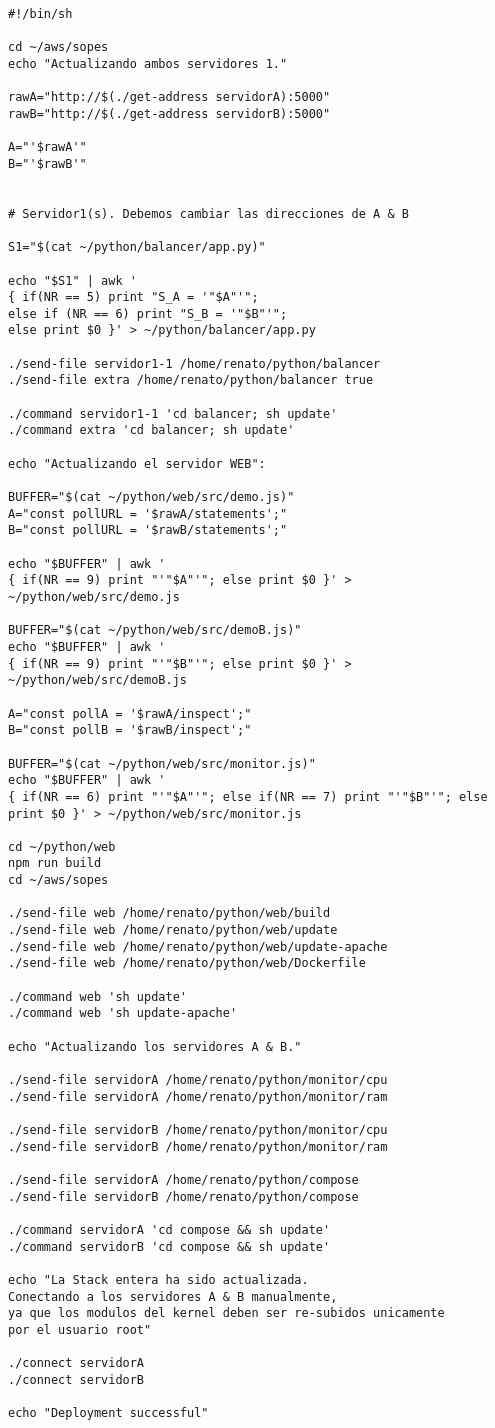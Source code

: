 \documentclass{article}
\begin{document}
\begin{lstlisting}[bash]
#!/bin/sh

cd ~/aws/sopes
echo "Actualizando ambos servidores 1."

rawA="http://$(./get-address servidorA):5000"
rawB="http://$(./get-address servidorB):5000"

A="'$rawA'"
B="'$rawB'"


# Servidor1(s). Debemos cambiar las direcciones de A & B

S1="$(cat ~/python/balancer/app.py)"

echo "$S1" | awk '
{ if(NR == 5) print "S_A = '"$A"'";
else if (NR == 6) print "S_B = '"$B"'"; 
else print $0 }' > ~/python/balancer/app.py 

./send-file servidor1-1 /home/renato/python/balancer
./send-file extra /home/renato/python/balancer true

./command servidor1-1 'cd balancer; sh update'
./command extra 'cd balancer; sh update'

echo "Actualizando el servidor WEB":

BUFFER="$(cat ~/python/web/src/demo.js)"
A="const pollURL = '$rawA/statements';"
B="const pollURL = '$rawB/statements';"

echo "$BUFFER" | awk '
{ if(NR == 9) print "'"$A"'"; else print $0 }' > ~/python/web/src/demo.js 

BUFFER="$(cat ~/python/web/src/demoB.js)"
echo "$BUFFER" | awk '
{ if(NR == 9) print "'"$B"'"; else print $0 }' > ~/python/web/src/demoB.js 

A="const pollA = '$rawA/inspect';"
B="const pollB = '$rawB/inspect';"

BUFFER="$(cat ~/python/web/src/monitor.js)"
echo "$BUFFER" | awk '
{ if(NR == 6) print "'"$A"'"; else if(NR == 7) print "'"$B"'"; else print $0 }' > ~/python/web/src/monitor.js 

cd ~/python/web
npm run build
cd ~/aws/sopes

./send-file web /home/renato/python/web/build
./send-file web /home/renato/python/web/update
./send-file web /home/renato/python/web/update-apache
./send-file web /home/renato/python/web/Dockerfile

./command web 'sh update'
./command web 'sh update-apache'

echo "Actualizando los servidores A & B."

./send-file servidorA /home/renato/python/monitor/cpu
./send-file servidorA /home/renato/python/monitor/ram

./send-file servidorB /home/renato/python/monitor/cpu
./send-file servidorB /home/renato/python/monitor/ram

./send-file servidorA /home/renato/python/compose
./send-file servidorB /home/renato/python/compose

./command servidorA 'cd compose && sh update'
./command servidorB 'cd compose && sh update'

echo "La Stack entera ha sido actualizada.
Conectando a los servidores A & B manualmente,
ya que los modulos del kernel deben ser re-subidos unicamente 
por el usuario root"

./connect servidorA
./connect servidorB

echo "Deployment successful"
\end{lstlisting} 
\end{document}
